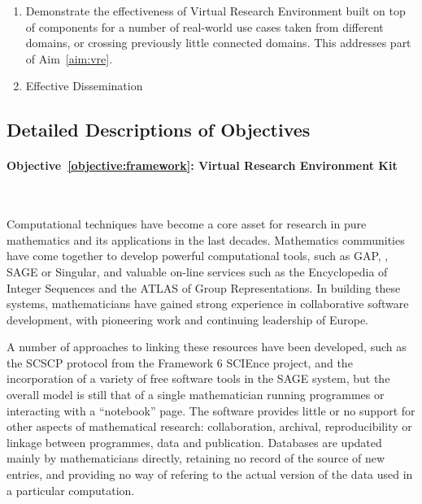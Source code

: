 \documentclass[noworkareas,deliverables,gitinfo,compactht]{euproposal}
\begin{document}
\begin{proposal}
\begin{enumerate}
\item \label{objective:demo}Demonstrate the effectiveness of Virtual Research Environment
  built on top of \TheProject components for a number of real-world
  use cases taken from different domains, or crossing previously
  little connected domains. This addresses part of Aim~\ref{aim:vre}.

\item \label{objective:disseminate}Effective Dissemination

\end{enumerate}

\subsection*{Detailed Descriptions of Objectives} %

\paragraph{Objective~\ref{objective:framework}: Virtual Research
  Environment Kit}\ 

Computational techniques have become a core asset for research in pure
  mathematics and its applications in the last decades. Mathematics
  communities have come together to develop powerful computational
  tools, such as GAP, \PariGP, SAGE or Singular, and valuable on-line
  services such as the Encyclopedia of Integer Sequences and the ATLAS
  of Group Representations.  In building these systems, 
  mathematicians have gained strong
  experience in collaborative software development, with pioneering
  work and continuing leadership of Europe.

A number of approaches to linking these resources have been developed,
such as the SCSCP protocol from the Framework 6 SCIEnce project, and
the incorporation of a variety of free software tools in the SAGE
system, but the overall model is still that of a single mathematician
running programmes or interacting with a ``notebook''
page. The software provides little or no support for other aspects of
mathematical research: collaboration,
archival, reproducibility or linkage between programmes, data and
publication. Databases are updated mainly by mathematicians directly,
retaining no record of the source of new entries, and providing no way
of refering to the actual version of the data used in a particular
computation.


\end{proposal}
\end{document}
